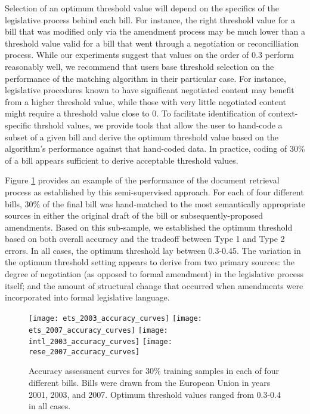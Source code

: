 \documentclass[11pt]{article}
\begin{document}
Selection of an optimum threshold value will depend on the specifics
of the legislative process behind each bill. For instance, the right
threshold value for a bill that was modified only via the amendment
process may be much lower than a threshold value valid for a bill that
went through a negotiation or reconcilliation process. While our experiments
suggest that values on the order of 0.3 perform reasonably well, we
recommend that users base threshold selection on the performance of
the matching algorithm in their particular case. For instance,
legislative procedures known to have significant negotiated content
may benefit from a higher threshold value, while those with very
little negotiated content might require a threshold value close to
0. To facilitate identification of context-specific thrshold values, we provide tools that allow the user to
hand-code a subset of a given bill and derive the optimum threshold
value based on the algorithm's performance against that hand-coded
data. In practice, coding of 30\% of a bill appears sufficient to
derive acceptable threshold values.

Figure \ref{fig:bill-accuracy-curves} provides an example of the
performance of the document retrieval process as established by this
semi-supervised approach. For each of four different bills, 30\% of
the final bill was hand-matched to the most semantically appropriate
sources in either the original draft of the bill or
subsequently-proposed amendments. Based on this sub-sample, we
established the optimum threshold based on both overall accuracy and
the tradeoff between Type 1 and Type 2 errors. In all cases, the
optimum threshold lay between 0.3-0.45. The variation in the optimum
threshold setting appears to derive from two primary sources: the
degree of negotiation (as opposed to formal amendment) in the
legislative process itself; and the amount of structural change that
occurred when amendments were incorporated into formal legislative language.

\begin{figure}[ht]
  \centering
  \texttt{[image: ets\_2003\_accuracy\_curves]}
  \texttt{[image: ets\_2007\_accuracy\_curves]}
  \texttt{[image: intl\_2003\_accuracy\_curves]}
  \texttt{[image: rese\_2007\_accuracy\_curves]}
  \caption{Accuracy assessment curves for 30\% training samples in
    each of four different bills. Bills were drawn from the European
    Union in years 2001, 2003, and 2007. Optimum threshold values
    ranged from 0.3-0.4 in all cases.}
  \label{fig:bill-accuracy-curves}
\end{figure}
\end{document}
